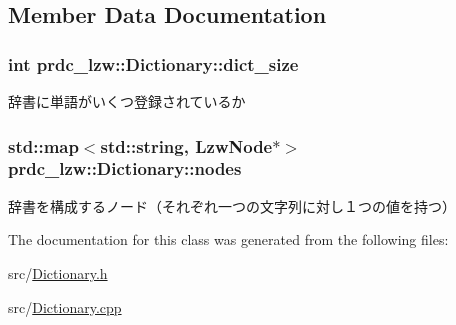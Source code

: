 \subsection{Member Data Documentation}
\hypertarget{classprdc__lzw_1_1Dictionary_ac96b4db6d4692ba9b082fe32e54bcf0d}{
\subsubsection[{dict\-\_\-size}]{\setlength{\rightskip}{0pt plus 5cm}int prdc\-\_\-lzw\-::\-Dictionary\-::dict\-\_\-size\hspace{0.3cm}{\ttfamily [private]}}}\label{classprdc__lzw_1_1Dictionary_ac96b4db6d4692ba9b082fe32e54bcf0d}


辞書に単語がいくつ登録されているか 

\hypertarget{classprdc__lzw_1_1Dictionary_af204400d56e05c8a3fcc25bfd0990ff9}{
\subsubsection[{nodes}]{\setlength{\rightskip}{0pt plus 5cm}std\-::map$<$std\-::string, {\bf Lzw\-Node}$\ast$$>$ prdc\-\_\-lzw\-::\-Dictionary\-::nodes\hspace{0.3cm}{\ttfamily [private]}}}\label{classprdc__lzw_1_1Dictionary_af204400d56e05c8a3fcc25bfd0990ff9}


辞書を構成するノード（それぞれ一つの文字列に対し１つの値を持つ） 



The documentation for this class was generated from the following files\-:\begin{DoxyCompactItemize}
\item 
src/\hyperlink{Dictionary_8h}{Dictionary.\-h}\item 
src/\hyperlink{Dictionary_8cpp}{Dictionary.\-cpp}\end{DoxyCompactItemize}

